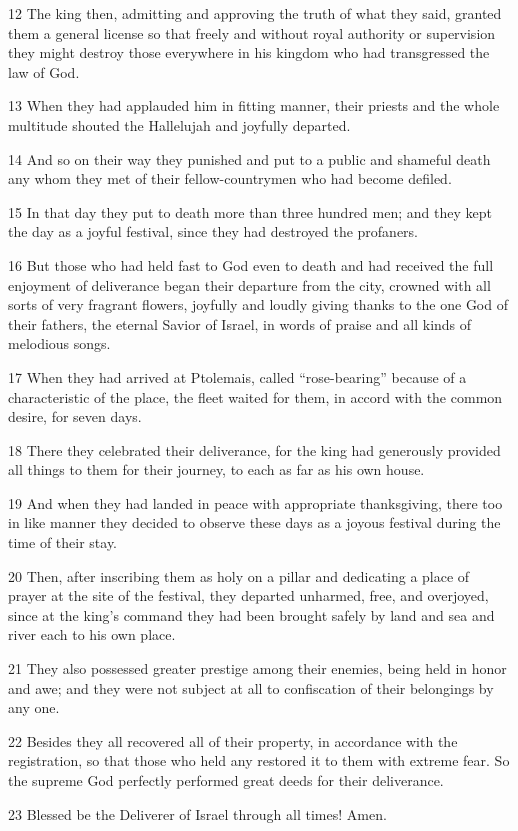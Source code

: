 \par 12 The king then, admitting and approving the truth of what they said, granted them a general license so that freely and without royal authority or supervision they might destroy those everywhere in his kingdom who had transgressed the law of God.
\par 13 When they had applauded him in fitting manner, their priests and the whole multitude shouted the Hallelujah and joyfully departed.
\par 14 And so on their way they punished and put to a public and shameful death any whom they met of their fellow-countrymen who had become defiled.
\par 15 In that day they put to death more than three hundred men; and they kept the day as a joyful festival, since they had destroyed the profaners.
\par 16 But those who had held fast to God even to death and had received the full enjoyment of deliverance began their departure from the city, crowned with all sorts of very fragrant flowers, joyfully and loudly giving thanks to the one God of their fathers, the eternal Savior of Israel, in words of praise and all kinds of melodious songs.
\par 17 When they had arrived at Ptolemais, called “rose-bearing” because of a characteristic of the place, the fleet waited for them, in accord with the common desire, for seven days.
\par 18 There they celebrated their deliverance, for the king had generously provided all things to them for their journey, to each as far as his own house.
\par 19 And when they had landed in peace with appropriate thanksgiving, there too in like manner they decided to observe these days as a joyous festival during the time of their stay.
\par 20 Then, after inscribing them as holy on a pillar and dedicating a place of prayer at the site of the festival, they departed unharmed, free, and overjoyed, since at the king's command they had been brought safely by land and sea and river each to his own place.
\par 21 They also possessed greater prestige among their enemies, being held in honor and awe; and they were not subject at all to confiscation of their belongings by any one.
\par 22 Besides they all recovered all of their property, in accordance with the registration, so that those who held any restored it to them with extreme fear. So the supreme God perfectly performed great deeds for their deliverance.
\par 23 Blessed be the Deliverer of Israel through all times! Amen.

